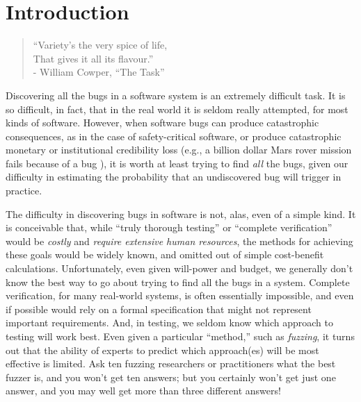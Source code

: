 \documentclass[sigplan,screen]{acmart}
\begin{document}



\maketitle

\section{Introduction}

\begin{quote}
  ``Variety's the very spice of life,\\
  That gives it all its flavour.''
  \\ - William Cowper, ``The Task''
  \end{quote}

Discovering all the bugs in a software system is an extremely
difficult task.  It is so difficult, in fact, that in the real world
it is seldom really attempted, for most kinds of software.  However,
when software bugs can produce catastrophic consequences, as in the
case of safety-critical software, or produce catastrophic monetary or
institutional credibility
loss (e.g., a billion dollar Mars rover mission fails because of a bug
\cite{Spirit}), it is worth at least trying to find \emph{all} the bugs,
given our difficulty in estimating the probability that an
undiscovered bug will trigger in practice.

The difficulty in discovering bugs in software is not, alas, even of
a simple kind.  It is conceivable that, while ``truly thorough testing'' or
``complete verification'' would be \emph{costly} and \emph{require
  extensive human resources}, the methods for achieving these goals
would be widely known, and omitted out of simple cost-benefit
calculations.  Unfortunately, even given will-power and budget, we
generally don't know the best way to go about trying to find all the
bugs in a system.  Complete verification, for many real-world systems,
is often essentially impossible, and even if possible would rely on a
formal specification that might not represent important requirements.
And, in testing, we seldom know which approach to testing will work
best.  Even given a particular ``method,'' such as \emph{fuzzing}, it
turns out that the ability of experts to predict which approach(es)
will be most effective is limited.  Ask ten fuzzing researchers or
practitioners what the best fuzzer is, and you won't get ten answers;
but you certainly won't get just one answer, and you may well get more
than three different answers!
\end{document}
